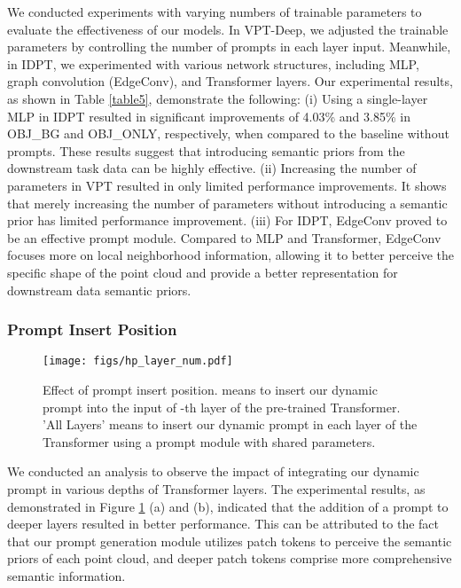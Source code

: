 \documentclass[10pt,twocolumn,letterpaper]{article}
\begin{document}
We conducted experiments with varying numbers of trainable parameters to evaluate the effectiveness of our models. In VPT-Deep, we adjusted the trainable parameters by controlling the number of prompts in each layer input. Meanwhile, in IDPT, we experimented with various network structures, including MLP, graph convolution (EdgeConv), and Transformer layers. Our experimental results, as shown in Table \ref{table5}, demonstrate the following: (i) Using a single-layer MLP in IDPT resulted in significant improvements of 4.03\% and 3.85\% in OBJ\_BG and OBJ\_ONLY, respectively, when compared to the baseline without prompts. These results suggest that introducing semantic priors from the downstream task data can be highly effective. (ii) Increasing the number of parameters in VPT resulted in only limited performance improvements. It shows that merely increasing the number of parameters without introducing a semantic prior has limited performance improvement. (iii) For IDPT, EdgeConv proved to be an effective prompt module. Compared to MLP and Transformer, EdgeConv focuses more on local neighborhood information, allowing it to better perceive the specific shape of the point cloud and provide a better representation for downstream data semantic priors.

\subsubsection{Prompt Insert Position} 
\label{subsubsec:prompt_insert}

\begin{figure}[t]
\centering
\texttt{[image: figs/hp\_layer\_num.pdf]} 
\caption{Effect of prompt insert position.  means to insert our dynamic prompt into the input of -th layer of the pre-trained Transformer. 'All Layers' means to insert our dynamic prompt in each layer of the Transformer using a prompt module with shared parameters.}
\label{abl_layer}
\end{figure}

We conducted an analysis to observe the impact of integrating our dynamic prompt in various depths of Transformer layers. The experimental results, as demonstrated in Figure \ref{abl_layer} (a) and (b), indicated that the addition of a prompt to deeper layers resulted in better performance. This can be attributed to the fact that our prompt generation module utilizes patch tokens to perceive the semantic priors of each point cloud, and deeper patch tokens comprise more comprehensive semantic information.
\end{document}
